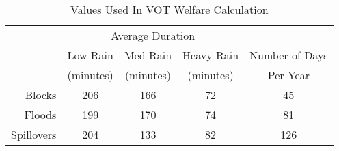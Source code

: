 \captionsetup{labelsep=newline}
\begin{table}[!htbp]
\centering

\caption{Values Used In VOT Welfare Calculation}
\label{table:VOT-main-desc}

  \begin{tabular}{r c c c c}
    \hline
    \hline
    & \multicolumn{3}{c}{Average Duration} & \\
    & Low Rain & Med Rain & Heavy Rain & Number of Days\\
    & (minutes) & (minutes) & (minutes) & Per Year \\
    \hline
    Blocks & 206 & 166 & 72 & 45 \\
    Floods & 199 & 170 & 74 & 81 \\
    Spillovers & 204 & 133 & 82 & 126 \\
    \hline
    \hline
  \end{tabular}
  
\end{table}
